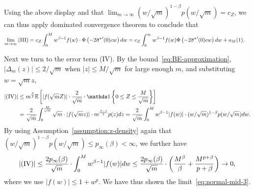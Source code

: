 Using the above display and that $\lim_{m \to \infty} (w/\sqrt{m})^{1-\beta}
p(w/\sqrt{m}) = c_Z$, we can thus apply dominated convergence theorem
to conclude that
\begin{align*}
	\lim_{m \to \infty}\mathrm{(III)} 
	&  = c_Z \int_0^M w^{\beta - 1} f(w) \cdot  \Phi  \left( - 2 {\wb{\sigma}\opt}'(0) cw\right) dw = c_Z \int_0^\infty w^{\beta - 1} f(w) \Phi \left( - 2{\wb{\sigma}\opt}'(0) cw \right) dw + o_M(1). %
\end{align*} 

Next we turn to the error term (IV). By the
bound~\eqref{eq:BE-approximation}, $|\Delta_m(z)| \leq 2/\sqrt{m}$ when $|z|
\leq M/\sqrt{m}$ for large enough $m$, and substituting $w = \sqrt{m}z$,
\begin{align*}
	|\mathrm{(IV)}| & \leq m^{\frac{\beta}{2}} \Ep \left[|f(\sqrt m Z)| \cdot \frac{2}{\sqrt m} \cdot \ind\left\{0 \leq Z \leq \frac{M}{\sqrt m}\right\}   \right] \nonumber \\
	& = \frac{2}{\sqrt m} \int_0^{\frac{M}{\sqrt m}} \sqrt m \cdot |f(\sqrt m z)| \cdot m^{\frac{\beta-1}{2}} p(z) dz  = \frac{2}{\sqrt m} \int_0^M w^{\beta - 1}|f(w)| \cdot(w/\sqrt{m})^{1-\beta} p(w/\sqrt{m}) dw.
\end{align*}
By using Assumption~\ref{assumption:z-density} again that $(w/\sqrt{m})^{1-\beta} p(w/\sqrt{m}) \leq p_\infty(\beta) < \infty$, we further have
\begin{equation*}
  |\mathrm{(IV)}| 
  \leq \frac{2p_\infty(\beta) }{\sqrt m} \cdot \int_0^M w^{\beta - 1}|f(w)| dw
  \leq  \frac{2p_\infty(\beta) }{\sqrt m} \cdot
  \left({\frac{M^\beta}{\beta} +\frac{M^{p+\beta}}{p+\beta}}\right)
  \to 0,
\end{equation*}
where we use $|f(w)| \leq 1+w^p$. We have thus shown the
limit~\eqref{eq:normal-mid-3}.

